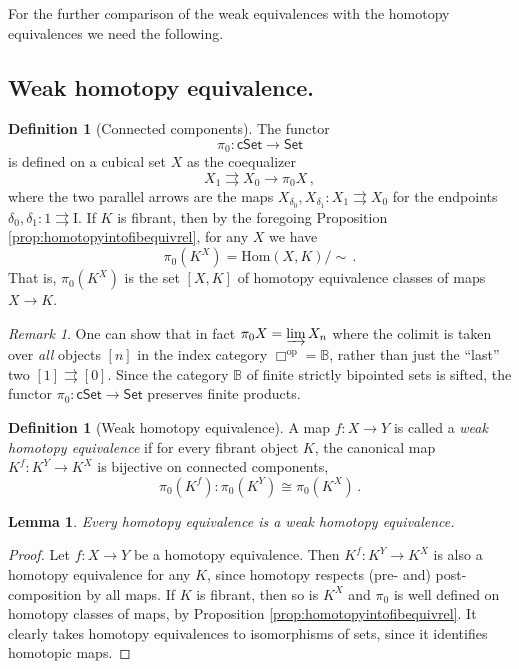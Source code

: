 \documentclass[11pt,reqno]{amsart}
\newcommand{\B}{\ensuremath{\mathbb{B}}}
\newcommand{\Set}{\ensuremath{\mathsf{Set}}}
\newcommand{\cSet}{\ensuremath{\mathsf{cSet}}}
\newcommand{\op}[1]{\ensuremath{{#1}^{\mathrm{op}}}}
\newcommand{\ra}{\ensuremath{\rightarrow}}
\renewcommand{\hom}{\ensuremath{\mathrm{Hom}}}
\newcommand{\I}{\ensuremath{\mathrm{I}}}
\newtheorem{lemma}[theorem]{Lemma}
\theoremstyle{remark}
\newtheorem{remark}[theorem]{Remark}
\theoremstyle{definition}
\newtheorem{definition}[theorem]{Definition}
\begin{document}
For the further comparison of the weak equivalences with the homotopy equivalences we need the following.

\subsection*{Weak homotopy equivalence.}

\begin{definition}[Connected components]
The functor 
\[
\pi_0 : \cSet\ra\Set
\]
 is defined on a cubical set $X$ as the coequalizer 
 \[
 X_1\rightrightarrows X_0\ra \pi_0X\,,
 \]
  where the two parallel arrows are the maps $X_{\delta_0}, X_{\delta_1} : X_1 \rightrightarrows X_0$ for the endpoints $\delta_0, \delta_1 : 1 \rightrightarrows \I$.   If $K$ is fibrant, then by the foregoing Proposition \ref{prop:homotopyintofibequivrel}, for any $X$ we have  
  \[
  \pi_0(K^X) = \hom(X,K)/\!\!\sim\,.
  \]
    That is, $\pi_0(K^X)$ is the set  $[X, K]$ of homotopy equivalence classes of maps $X\ra K$.
\end{definition}

\begin{remark}
One can show that in fact $\pi_0X = \varinjlim X_n$ where the colimit is taken over \emph{all} objects $[n]$ in the index category $\op\Box = \B$, rather than just the ``last'' two $[1]\rightrightarrows [0]$. Since the category $\B$ of finite strictly bipointed sets is sifted, 
the functor $\pi_0: \cSet\ra\Set$ preserves finite products. 
\end{remark}

\begin{definition}[Weak homotopy equivalence]\label{def:WHE}
A map $f: X\ra Y$ is called a \emph{weak homotopy equivalence} if for every fibrant object $K$, the canonical map $K^f : K^Y \ra K^X$ is bijective on connected components,  
\[
\pi_0(K^f) : \pi_0(K^Y) \cong \pi_0(K^X)\,.
\]
\end{definition}

\begin{lemma}\label{lemma:HEisWHE}
Every homotopy equivalence is a weak homotopy equivalence.
\end{lemma}
%
\begin{proof}
Let $f: X\ra Y$ be a homotopy equivalence.  Then $K^f : K^Y \ra K^X$ is also a homotopy equivalence for any $K$, since homotopy respects (pre- and) post-composition by all maps.  If $K$ is fibrant, then so is $K^X$ and $\pi_0$ is well defined on homotopy classes of maps, by Proposition \ref{prop:homotopyintofibequivrel}.  It clearly takes homotopy equivalences to isomorphisms of sets, since it identifies homotopic maps.
\end{proof}
\end{document}
